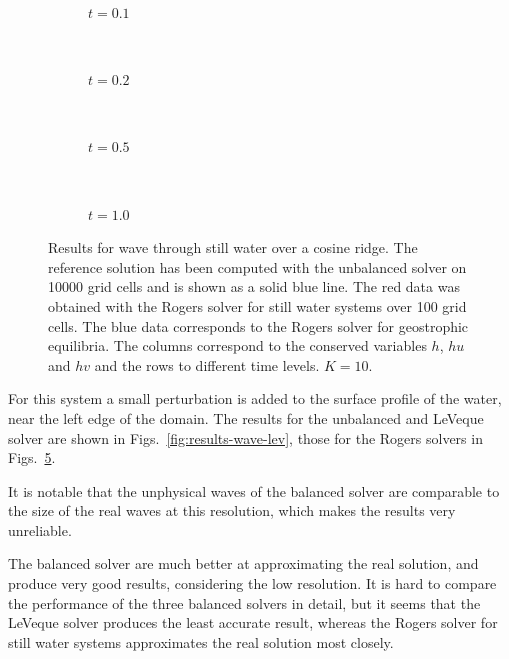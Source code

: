 \begin{figure}
  \centering
  \begin{subfigure}{\textwidth}
    \caption{$t = 0.1$}
    \label{fig:results-wave-rog-1}
  \end{subfigure} \\
  \begin{subfigure}{\textwidth}
    \caption{$t = 0.2$}
    \label{fig:results-wave-rog-2}
  \end{subfigure} \\
  \begin{subfigure}{\textwidth}
    \caption{$t = 0.5$}
    \label{fig:results-wave-rog-5}
  \end{subfigure} \\
  \begin{subfigure}{\textwidth}
    \caption{$t = 1.0$}
    \label{fig:results-wave-rog-10}
  \end{subfigure}
  \caption{Results for wave through still water over a cosine ridge. The reference solution has been computed with the unbalanced solver on 10000 grid cells and is shown as a solid blue line. The red data was obtained with the Rogers solver for still water systems over 100 grid cells. The blue data corresponds to the Rogers solver for geostrophic equilibria. The columns correspond to the conserved variables $h$, $hu$ and $hv$ and the rows to different time levels. $K = 10$.}
  \label{fig:results-wave-rog}
\end{figure}

For this system a small perturbation is added to the surface profile of the water, near the left edge of the domain. The results for the unbalanced and LeVeque solver are shown in Figs.~\ref{fig:results-wave-lev}, those for the Rogers solvers in Figs.~\ref{fig:results-wave-rog}.

It is notable that the unphysical waves of the balanced solver are comparable to the size of the real waves at this resolution, which makes the results very unreliable.

The balanced solver are much better at approximating the real solution, and produce very good results, considering the low resolution. It is hard to compare the performance of the three balanced solvers in detail, but it seems that the LeVeque solver produces the least accurate result, whereas the Rogers solver for still water systems approximates the real solution most closely.

